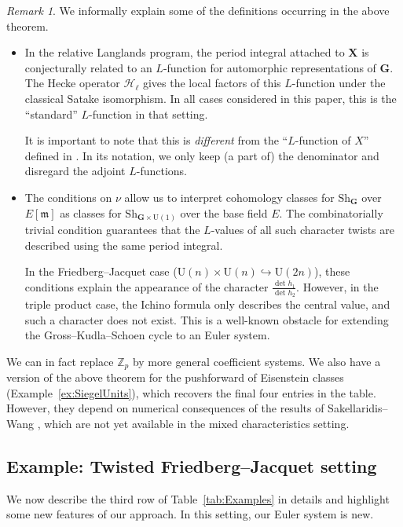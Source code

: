 \documentclass{amsart}
\theoremstyle{definition}
\theoremstyle{remark}
\newtheorem{remark}[theorem]{Remark}
\newcommand{\1}{\mathbf{1}}
\newcommand{\m}{\mathfrak{m}}
\newcommand{\mb}[1]{\mathbf{#1}}
\newcommand{\sh}[1]{\mathcal{#1}}
\newcommand{\U}{\mathrm{U}}
\newcommand{\Z}{\mathbb{Z}}
\theoremstyle{definition}
\newcommand{\bG}{\mathbf{G}}
\newcommand{\Sh}{\mathrm{Sh}}
\begin{document}
\begin{remark}
    We informally explain some of the definitions occurring in the above theorem.
    \begin{itemize}
        \item  In the relative Langlands program, the period integral attached to $\mb{X}$ is conjecturally related to an $L$-function for automorphic representations of $\mb{G}$. The Hecke operator $\sh{H}_\ell$ gives the local factors of this $L$-function under the classical Satake isomorphism. In all cases considered in this paper, this is the ``standard'' $L$-function in that setting.

        It is important to note that this is \emph{different} from the ``$L$-function of $X$'' defined in \cite[Definition 7.2.3]{SakSpherical}. In its notation, we only keep (a part of) the denominator and disregard the adjoint $L$-functions.
        \item  The conditions on $\nu$ allow us to interpret cohomology classes for $\Sh_\bG$ over $E[\m]$ as classes for $\Sh_{\bG\times\U(1)}$ over the base field $E$. The combinatorially trivial condition guarantees that the $L$-values of all such character twists are described using the same period integral.
    
        In the Friedberg--Jacquet case ($\U(n)\times\U(n)\hookrightarrow\U(2n)$), these conditions explain the appearance of the character $\frac{\det h_1}{\det h_2}$. However, in the triple product case, the Ichino formula only describes the central value, and such a character does not exist. This is a well-known obstacle for extending the Gross--Kudla--Schoen cycle to an Euler system.
    \end{itemize}
\end{remark}

We can in fact replace $\Z_p$ by more general coefficient systems. We also have a version of the above theorem for the pushforward of Eisenstein classes (Example~\ref{ex:SiegelUnits}), which recovers the final four entries in the table. However, they depend on numerical consequences of the results of Sakellaridis--Wang \cite{SakWang}, which are not yet available in the mixed characteristics setting. 

\subsection{Example: Twisted Friedberg--Jacquet setting}\label{ss:TwistedFJ}
We now describe the third row of Table~\ref{tab:Examples} in details and highlight some new features of our approach. In this setting, our Euler system is new.
\end{document}
